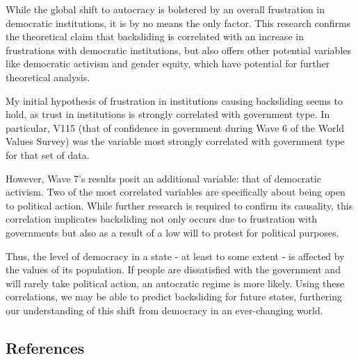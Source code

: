 \documentclass[
  letterpaper,
  DIV=11,
  numbers=noendperiod]{scrartcl}
\begin{document}
While the global shift to autocracy is bolstered by an overall
frustration in democratic institutions, it is by no means the only
factor. This research confirms the theoretical claim that backsliding is
correlated with an increase in frustrations with democratic
institutions, but also offers other potential variables like democratic
activism and gender equity, which have potential for further theoretical
analysis.

My initial hypothesis of frustration in institutions causing backsliding
seems to hold, as trust in institutions is strongly correlated with
government type. In particular, V115 (that of confidence in government
during Wave 6 of the World Values Survey) was the variable most strongly
correlated with government type for that set of data.

However, Wave 7's results posit an additional variable: that of
democratic activism. Two of the most correlated variables are
specifically about being open to political action. While further
research is required to confirm its causality, this correlation
implicates backsliding not only occurs due to frustration with
governments but also as a result of a low will to protest for political
purposes.

Thus, the level of democracy in a state - at least to some extent - is
affected by the values of its population. If people are dissatisfied
with the government and will rarely take political action, an autocratic
regime is more likely. Using these correlations, we may be able to
predict backsliding for future states, furthering our understanding of
this shift from democracy in an ever-changing world.

\subsection{References}\label{references}
\end{document}
